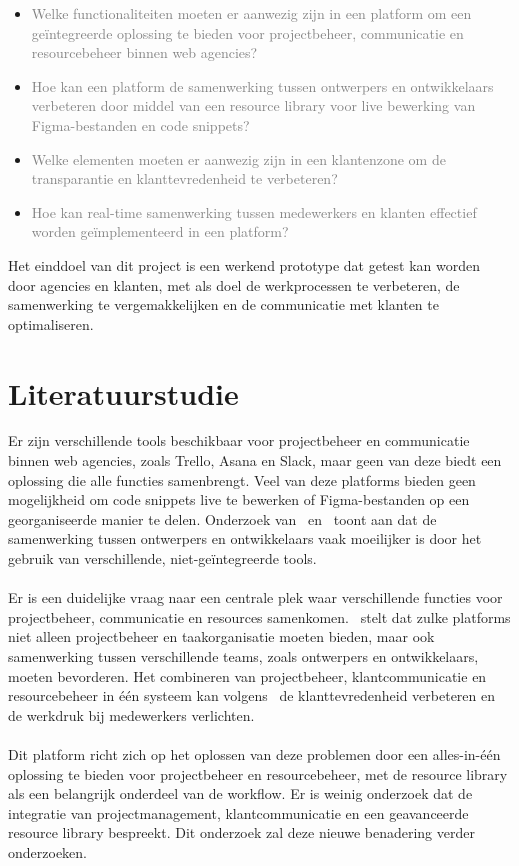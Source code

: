 \begin{itemize}
    \item \textcolor{gray}{Welke functionaliteiten moeten er aanwezig zijn in een platform om een geïntegreerde oplossing te bieden voor projectbeheer, communicatie en resourcebeheer binnen web agencies?}
    \item \textcolor{gray}{Hoe kan een platform de samenwerking tussen ontwerpers en ontwikkelaars verbeteren door middel van een resource library voor live bewerking van Figma-bestanden en code snippets?}
    \item \textcolor{gray}{Welke elementen moeten er aanwezig zijn in een klantenzone om de transparantie en klanttevredenheid te verbeteren?}
    \item \textcolor{gray}{Hoe kan real-time samenwerking tussen medewerkers en klanten effectief worden geïmplementeerd in een platform?}
\end{itemize}

Het einddoel van dit project is een werkend prototype dat getest kan worden door agencies en klanten, met als doel de werkprocessen te verbeteren, de samenwerking te vergemakkelijken en de communicatie met klanten te optimaliseren.


\section{Literatuurstudie}%
\label{sec:literatuurstudie}
Er zijn verschillende tools beschikbaar voor projectbeheer en communicatie binnen web agencies, zoals Trello, Asana en Slack, maar geen van deze biedt een oplossing die alle functies samenbrengt. Veel van deze platforms bieden geen mogelijkheid om code snippets live te bewerken of Figma-bestanden op een georganiseerde manier te delen. Onderzoek van~\textcite{Reid2014} en~\textcite{Alexander2019} toont aan dat de samenwerking tussen ontwerpers en ontwikkelaars vaak moeilijker is door het gebruik van verschillende, niet-geïntegreerde tools.
\\
\\
Er is een duidelijke vraag naar een centrale plek waar verschillende functies voor projectbeheer, communicatie en resources samenkomen.~\textcite{Santoso2024} stelt dat zulke platforms niet alleen projectbeheer en taakorganisatie moeten bieden, maar ook samenwerking tussen verschillende teams, zoals ontwerpers en ontwikkelaars, moeten bevorderen. Het combineren van projectbeheer, klantcommunicatie en resourcebeheer in één systeem kan volgens~\textcite{Chris2024} de klanttevredenheid verbeteren en de werkdruk bij medewerkers verlichten.
\\
\\
Dit platform richt zich op het oplossen van deze problemen door een alles-in-één oplossing te bieden voor projectbeheer en resourcebeheer, met de resource library als een belangrijk onderdeel van de workflow. Er is weinig onderzoek dat de integratie van projectmanagement, klantcommunicatie en een geavanceerde resource library bespreekt. Dit onderzoek zal deze nieuwe benadering verder onderzoeken.


